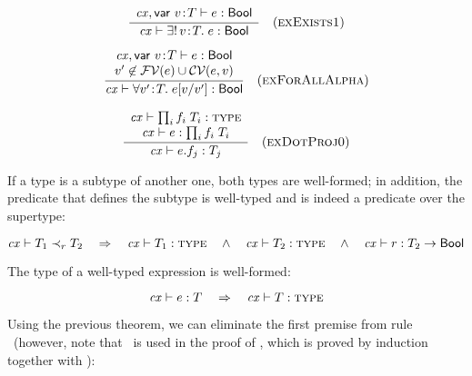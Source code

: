\begin{theorem}\label{thm-eexI}
{\rm
\[
\frac{\begin{array}{c}\mathit{cx},\mathsf{var}\ v\!:\!T\vdash e:\mathsf{Bool}\end{array}}{\mathit{cx}\vdash\exists!\,v\!:\!T.\;e:\mathsf{Bool}}\quad\mbox{(\textsc{exExists1})}
\]
}
\end{theorem}

\begin{theorem}\label{thm-efaalphaO}
{\rm
\[
\frac{\begin{array}{c}\mathit{cx},\mathsf{var}\ v\!:\!T\vdash e:\mathsf{Bool}\\v'\not\in\mathcal{FV}(e)\cup\mathcal{CV}(e,v)\end{array}}{\mathit{cx}\vdash\forall v'\!:\!T.\;e[v/v']:\mathsf{Bool}}\quad\mbox{(\textsc{exForAllAlpha})}
\]
}
\end{theorem}

\begin{theorem}\label{thm-edotO}
{\rm
\[
\frac{\begin{array}{c}\mathit{cx}\vdash\prod_{i}f_i\;T_i:\textsc{type}\\\mathit{cx}\vdash e:\prod_{i}f_i\;T_i\end{array}}{\mathit{cx}\vdash e.f_j:T_j}\quad\mbox{(\textsc{exDotProj0})}
\]
}
\end{theorem}





If a type is a subtype of another one, both types are well-formed; in
addition, the predicate that defines the subtype is well-typed and is indeed a
predicate over the supertype:

\begin{theorem}\label{thm-subtyping-wf}
\[
\mathit{cx}\vdash T_1\prec_{r}T_2
\ \ \ \Rightarrow\ \ \
\mathit{cx}\vdash T_1:\textsc{type}
\ \ \ \wedge\ \ \
\mathit{cx}\vdash T_2:\textsc{type}
\ \ \ \wedge\ \ \
\mathit{cx}\vdash r:T_2\to\mathsf{Bool}
\]
\end{theorem}

The type of a well-typed expression is well-formed:

\begin{theorem}\label{thm-exty-wf}
\[
\hastyO{\expr}{\typ}\ \ \IMPLIES\ \ \istyO{\typ}
\]
\end{theorem}

Using the previous theorem, we can eliminate the first premise from rule
\RedotO\ (however, note that \RedotO\ is used in the proof of
, which is proved by induction together with
\thmref{thm-exty-wf}):

